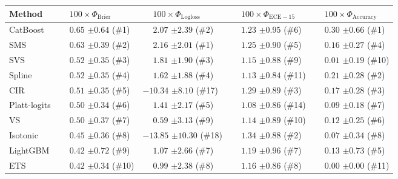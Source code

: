 \begin{tabular}{lllll}
\toprule
Method & $\phantom{-} 100 \times \Phi_\mathrm{Brier}$ & $\phantom{-} 100 \times \Phi_\mathrm{Logloss}$ & $\phantom{-} 100 \times \Phi_\mathrm{ECE-15}$ & $\phantom{-} 100 \times \Phi_\mathrm{Accuracy}$ \\
\midrule
CatBoost & $\phantom{-}0.65$ {\tiny $\pm 0.64$} (\#1) & $\phantom{-}2.07$ {\tiny $\pm 2.39$} (\#2) & $\phantom{-}1.23$ {\tiny $\pm 0.95$} (\#6) & $\phantom{-}0.30$ {\tiny $\pm 0.66$} (\#1) \\
SMS & $\phantom{-}0.63$ {\tiny $\pm 0.39$} (\#2) & $\phantom{-}2.16$ {\tiny $\pm 2.01$} (\#1) & $\phantom{-}1.25$ {\tiny $\pm 0.90$} (\#5) & $\phantom{-}0.16$ {\tiny $\pm 0.27$} (\#4) \\
SVS & $\phantom{-}0.52$ {\tiny $\pm 0.35$} (\#3) & $\phantom{-}1.81$ {\tiny $\pm 1.90$} (\#3) & $\phantom{-}1.15$ {\tiny $\pm 0.88$} (\#9) & $\phantom{-}0.01$ {\tiny $\pm 0.19$} (\#10) \\
Spline & $\phantom{-}0.52$ {\tiny $\pm 0.35$} (\#4) & $\phantom{-}1.62$ {\tiny $\pm 1.88$} (\#4) & $\phantom{-}1.13$ {\tiny $\pm 0.84$} (\#11) & $\phantom{-}0.21$ {\tiny $\pm 0.28$} (\#2) \\
CIR & $\phantom{-}0.51$ {\tiny $\pm 0.35$} (\#5) & $-10.34$ {\tiny $\pm 8.10$} (\#17) & $\phantom{-}1.29$ {\tiny $\pm 0.89$} (\#3) & $\phantom{-}0.17$ {\tiny $\pm 0.28$} (\#3) \\
Platt-logits & $\phantom{-}0.50$ {\tiny $\pm 0.34$} (\#6) & $\phantom{-}1.41$ {\tiny $\pm 2.17$} (\#5) & $\phantom{-}1.08$ {\tiny $\pm 0.86$} (\#14) & $\phantom{-}0.09$ {\tiny $\pm 0.18$} (\#7) \\
VS & $\phantom{-}0.50$ {\tiny $\pm 0.37$} (\#7) & $\phantom{-}0.59$ {\tiny $\pm 3.13$} (\#9) & $\phantom{-}1.14$ {\tiny $\pm 0.89$} (\#10) & $\phantom{-}0.12$ {\tiny $\pm 0.25$} (\#6) \\
Isotonic & $\phantom{-}0.45$ {\tiny $\pm 0.36$} (\#8) & $-13.85$ {\tiny $\pm 10.30$} (\#18) & $\phantom{-}1.34$ {\tiny $\pm 0.88$} (\#2) & $\phantom{-}0.07$ {\tiny $\pm 0.34$} (\#8) \\
LightGBM & $\phantom{-}0.42$ {\tiny $\pm 0.72$} (\#9) & $\phantom{-}1.07$ {\tiny $\pm 2.66$} (\#7) & $\phantom{-}1.19$ {\tiny $\pm 0.96$} (\#7) & $\phantom{-}0.13$ {\tiny $\pm 0.73$} (\#5) \\
ETS & $\phantom{-}0.42$ {\tiny $\pm 0.34$} (\#10) & $\phantom{-}0.99$ {\tiny $\pm 2.38$} (\#8) & $\phantom{-}1.16$ {\tiny $\pm 0.86$} (\#8) & $\phantom{-}0.00$ {\tiny $\pm 0.00$} (\#11) \\

\end{tabular}
